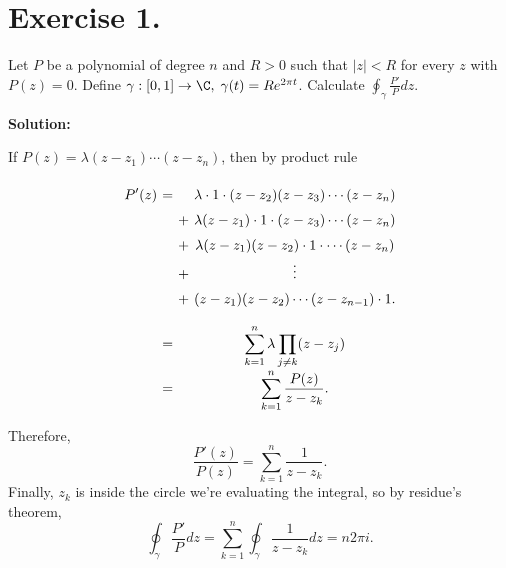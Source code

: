 \section*{Exercise 1.}

Let $P$ be a polynomial of degree $n$ and $R > 0$ such that $|z|<R$ for every $z$ with $P(z) = 0$. Define $\gamma : [0,1] \to \C,\; \gamma(t) = R e^{2\pi t}$. Calculate $\displaystyle \oint_\gamma \frac{P'}{P} dz$.

\textbf{Solution:}

If $P(z) = \lambda (z- z_1)\cdots (z-z_n)$, then by product rule

\[ \everymath{\displaystyle}
\arraycolsep=1.8pt\def\arraystretch{1.5}
\begin{array}{rccc}
    P'(z) & = & & \lambda \cdot 1\cdot (z-z_2)(z-z_3)\cdots (z-z_n)\\
    & & + & \lambda (z-z_1)\cdot 1\cdot(z-z_3)\cdots (z-z_n)\\
    & & + & \lambda (z-z_1)(z-z_2)\cdot 1\cdot\cdots (z-z_n)\\
    & & + & \vdots\\
    & & + & (z-z_1)(z-z_2)\cdots (z-z_{n-1})\cdot 1.\\[1em]
    & = & & \sum_{k = 1}^{n} \lambda  \prod_{j \neq k} (z-z_j)\\[1em]
    & = & & \sum_{k = 1}^{n} \frac{P(z)}{z-z_k}.
\end{array}\]

Therefore,
\[ \frac{P'(z)}{P(z)} = \sum_{k = 1}^{n} \frac{1}{z-z_k}. \]
Finally, $z_k$ is inside the circle we're evaluating the integral, so by residue's theorem, 
\[ \oint_\gamma \frac{P'}{P} dz = \sum_{k = 1}^{n} \oint_\gamma \frac{1}{z-z_k} dz = n 2\pi i. \]